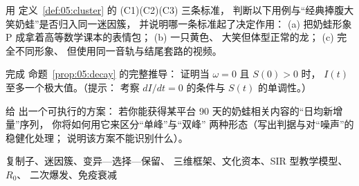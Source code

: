 \begin{nlexercises}
  \item 用
定义~\ref{def:05:cluster} 的 (C1)(C2)(C3) 三条标准，
 判断以下用例与“经典捧腹大笑奶蛙”是否归入同一迷因簇，
 并说明哪一条标准起了决定作用：
 (a) 把奶蛙形象 P 成拿着高等数学课本的表情包； (b) 一只黄色、
 大笑但体型正常的龙； (c) 完全不同形象、
 但使用同一音轨与结尾套路的视频。
  \item 完成
命题~\ref{prop:05:decay} 的完整推导：
 证明当 $\omega=0$ 且 $S(0)>0$ 时， $I(t)$ 至多一个极大值。（提示：
 考察 $dI/dt=0$ 的条件与 $S(t)$ 的单调性。）
  \item 给
出一个可执行的方案：
 若你能获得某平台 90 天的奶蛙相关内容的“日均新增量”序列，
 你将如何用它来区分“单峰”与“双峰”
 两种形态（写出判据与对“噪声”的稳健化处理；
 说明该方案不能识别什么）。
\end{nlexercises}

\nlkeywords 复制子、迷因簇、变异—选择—保留、
三维框架、文化资本、SIR 型教学模型、$R_0$、
二次爆发、免疫衰减
